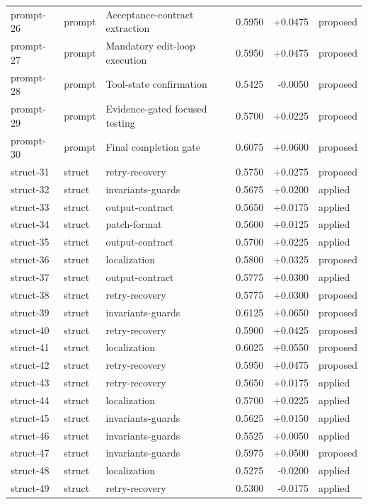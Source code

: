 \begin{center}
\begin{longtable}{llp{5.2cm}rrl}
prompt-26 & prompt & Acceptance-contract extraction & 0.5950 & +0.0475 & proposed \\
prompt-27 & prompt & Mandatory edit-loop execution & 0.5950 & +0.0475 & proposed \\
prompt-28 & prompt & Tool-state confirmation & 0.5425 & -0.0050 & proposed \\
prompt-29 & prompt & Evidence-gated focused testing & 0.5700 & +0.0225 & proposed \\
prompt-30 & prompt & Final completion gate & 0.6075 & +0.0600 & proposed \\
struct-31 & struct & retry-recovery & 0.5750 & +0.0275 & proposed \\
struct-32 & struct & invariants-guards & 0.5675 & +0.0200 & applied \\
struct-33 & struct & output-contract & 0.5650 & +0.0175 & applied \\
struct-34 & struct & patch-format & 0.5600 & +0.0125 & applied \\
struct-35 & struct & output-contract & 0.5700 & +0.0225 & applied \\
struct-36 & struct & localization & 0.5800 & +0.0325 & proposed \\
struct-37 & struct & output-contract & 0.5775 & +0.0300 & applied \\
struct-38 & struct & retry-recovery & 0.5775 & +0.0300 & proposed \\
struct-39 & struct & invariants-guards & 0.6125 & +0.0650 & proposed \\
struct-40 & struct & retry-recovery & 0.5900 & +0.0425 & proposed \\
struct-41 & struct & localization & 0.6025 & +0.0550 & proposed \\
struct-42 & struct & retry-recovery & 0.5950 & +0.0475 & proposed \\
struct-43 & struct & retry-recovery & 0.5650 & +0.0175 & applied \\
struct-44 & struct & localization & 0.5700 & +0.0225 & applied \\
struct-45 & struct & invariants-guards & 0.5625 & +0.0150 & applied \\
struct-46 & struct & invariants-guards & 0.5525 & +0.0050 & applied \\
struct-47 & struct & invariants-guards & 0.5975 & +0.0500 & proposed \\
struct-48 & struct & localization & 0.5275 & -0.0200 & applied \\
struct-49 & struct & retry-recovery & 0.5300 & -0.0175 & applied \\

\end{longtable}
\end{center}
